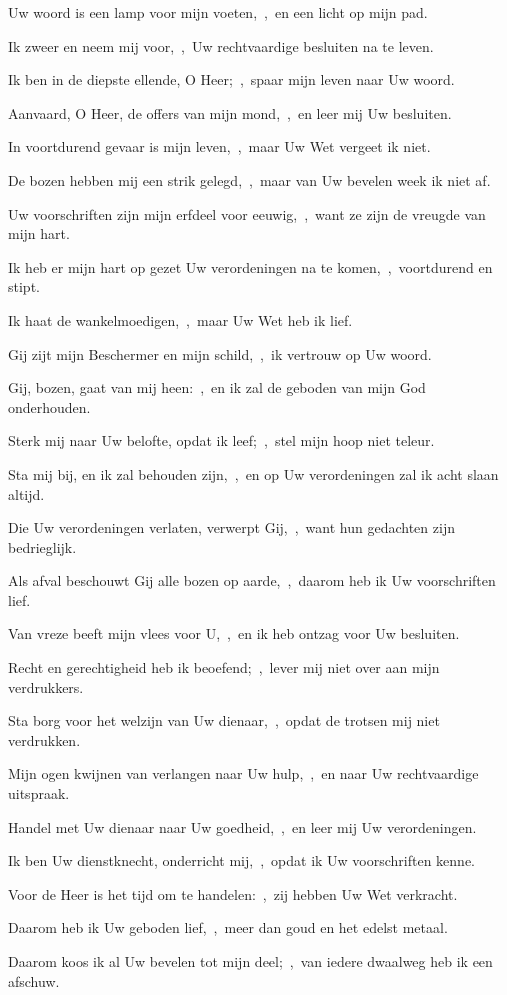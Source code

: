 \documentclass[12pt,twoside,a5paper]{article}
\begin{document}
\begin{halfparskip}
   Uw woord is een lamp voor mijn voeten,~\sep\ en een licht op mijn pad.

  Ik zweer en neem mij voor,~\sep\ Uw rechtvaardige besluiten na te leven.

  Ik ben in de diepste ellende, O Heer;~\sep\ spaar mijn leven naar Uw woord.

  Aanvaard, O Heer, de offers van mijn mond,~\sep\ en leer mij Uw besluiten.

  In voortdurend gevaar is mijn leven,~\sep\ maar Uw Wet vergeet ik niet.

  De bozen hebben mij een strik gelegd,~\sep\ maar van Uw bevelen week ik niet af.

  Uw voorschriften zijn mijn erfdeel voor eeuwig,~\sep\ want ze zijn de vreugde van mijn hart.

  Ik heb er mijn hart op gezet Uw verordeningen na te komen,~\sep\ voortdurend en stipt.
\end{halfparskip}

\begin{halfparskip}
   Ik haat de wankelmoedigen,~\sep\ maar Uw Wet heb ik lief.

  Gij zijt mijn Beschermer en mijn schild,~\sep\ ik vertrouw op Uw woord.

  Gij, bozen, gaat van mij heen:~\sep\ en ik zal de geboden van mijn God onderhouden.

  Sterk mij naar Uw belofte, opdat ik leef;~\sep\ stel mijn hoop niet teleur.

  Sta mij bij, en ik zal behouden zijn,~\sep\ en op Uw verordeningen zal ik acht slaan altijd.

  Die Uw verordeningen verlaten, verwerpt Gij,~\sep\ want hun gedachten zijn bedrieglijk.

  Als afval beschouwt Gij alle bozen op aarde,~\sep\ daarom heb ik Uw voorschriften lief.

  Van vreze beeft mijn vlees voor U,~\sep\ en ik heb ontzag voor Uw besluiten.
\end{halfparskip}

\begin{halfparskip}
   Recht en gerechtigheid heb ik beoefend;~\sep\ lever mij niet over aan mijn verdrukkers.

  Sta borg voor het welzijn van Uw dienaar,~\sep\ opdat de trotsen mij niet verdrukken.

  Mijn ogen kwijnen van verlangen naar Uw hulp,~\sep\ en naar Uw rechtvaardige uitspraak.

  Handel met Uw dienaar naar Uw goedheid,~\sep\ en leer mij Uw verordeningen.

  Ik ben Uw dienstknecht, onderricht mij,~\sep\ opdat ik Uw voorschriften kenne.

  Voor de Heer is het tijd om te handelen:~\sep\ zij hebben Uw Wet verkracht.

  Daarom heb ik Uw geboden lief,~\sep\ meer dan goud en het edelst metaal.

  Daarom koos ik al Uw bevelen tot mijn deel;~\sep\ van iedere dwaalweg heb ik een afschuw.
\end{halfparskip}
\end{document}

